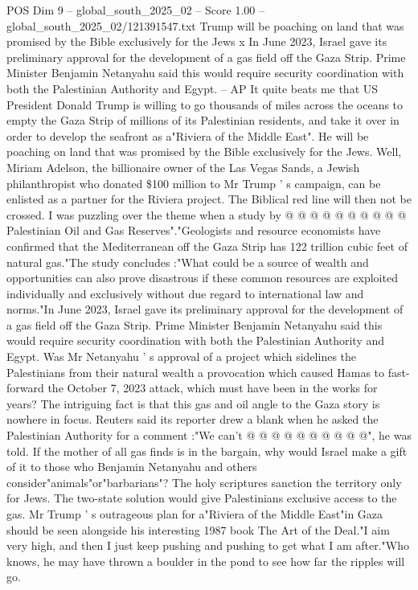 \begin{textsample}{POS Dim 9 – global\_south\_2025\_02 – Score 1.00 – global\_south\_2025\_02/121391547.txt}  \label{ex:f9_pos_261}
Trump will be poaching on land that was promised by the Bible exclusively for the Jews x In June 2023, Israel gave its preliminary approval for the development of a gas field off the Gaza Strip.
Prime Minister Benjamin Netanyahu said this would require security coordination with both the Palestinian Authority and Egypt. -- AP It quite beats me that US President Donald Trump is willing to go thousands of miles across the oceans to empty the Gaza Strip of millions of its Palestinian residents, and take it over in order to develop the seafront as a"Riviera of the Middle East".
He will be poaching on land that was promised by the Bible exclusively for the Jews.
Well, Miriam Adelson, the billionaire owner of the Las Vegas Sands, a Jewish philanthropist who donated \$100 million to Mr Trump ' s campaign, can be enlisted as a partner for the Riviera project.
The Biblical red line will then not be crossed.
I was puzzling over the theme when a study by @ @ @ @ @ @ @ @ @ @ Palestinian Oil and Gas Reserves"."Geologists and resource economists have confirmed that the Mediterranean off the Gaza Strip has 122 trillion cubic feet of natural gas."The study concludes :"What could be a source of wealth and opportunities can also prove disastrous if these common resources are exploited individually and exclusively without due regard to international law and norms."In June 2023, Israel gave its preliminary approval for the development of a gas field off the Gaza Strip.
Prime Minister Benjamin Netanyahu said this would require security coordination with both the Palestinian Authority and Egypt.
Was Mr Netanyahu ' s approval of a project which sidelines the Palestinians from their natural wealth a provocation which caused Hamas to fast-forward the October 7, 2023 attack, which must have been in the works for years?
The intriguing fact is that this gas and oil angle to the Gaza story is nowhere in focus.
Reuters said its reporter drew a blank when he asked the Palestinian Authority for a comment :"We can't @ @ @ @ @ @ @ @ @ @", he was told.
If the mother of all gas finds is in the bargain, why would Israel make a gift of it to those who Benjamin Netanyahu and others consider"animals"or"barbarians"?
The holy scriptures sanction the territory only for Jews.
The two-state solution would give Palestinians exclusive access to the gas.
Mr Trump ' s outrageous plan for a"Riviera of the Middle East"in Gaza should be seen alongside his interesting 1987 book The Art of the Deal."I aim very high, and then I just keep pushing and pushing to get what I am after."Who knows, he may have thrown a boulder in the pond to see how far the ripples will go.

\end{textsample}
